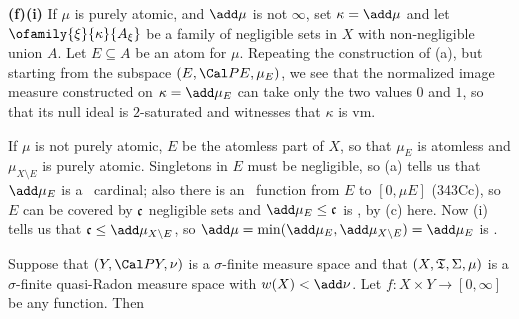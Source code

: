 {\medskip

{\bf (f)(i)} If $\mu$ is purely atomic, and $\add\mu$ is not $\infty$,
set $\kappa=\add\mu$ and let
$\ofamily{\xi}{\kappa}{A_{\xi}}$ be a family of negligible sets in $X$ with
non-negligible union $A$.   Let $E\subseteq A$ be an atom for $\mu$.
Repeating the construction of (a),
but starting from the subspace $(E,\Cal PE,\mu_E)$,
we see that the normalized image
measure constructed on $\kappa=\add\mu_E$ can take only the two values $0$
and $1$, so that its null
ideal is $2$-saturated and witnesses that $\kappa$ is \2vm.

\medskip

 If $\mu$ is not purely atomic, $E$ be the atomless part of
$X$, so that $\mu_E$ is atomless and $\mu_{X\setminus E}$ is purely atomic.
Singletons in $E$ must be
negligible, so (a) tells us that $\add\mu_E$ is a \rvm\ cardinal;
also there is an \imp\
function from $E$ to $[0,\mu E]$ (343Cc), so $E$ can be covered by
$\frak c$ negligible sets and
$\add\mu_E\le\frak c$ is \am, by (c) here.   Now (i) tells us that
$\frak c\le\add\mu_{X\setminus E}$, so
$\add\mu=\min(\add\mu_E,\add\mu_{X\setminus E})=\add\mu_E$ is \am.
}%


Suppose that $(Y,\Cal PY,\nu)$ is a
$\sigma$-finite measure space and that $(X,\frak T,\Sigma,\mu)$ is a
$\sigma$-finite quasi-Radon measure space with $w(X)<\add\nu$.   Let
$f:X\times Y\to[0,\infty]$ be any function.   Then


